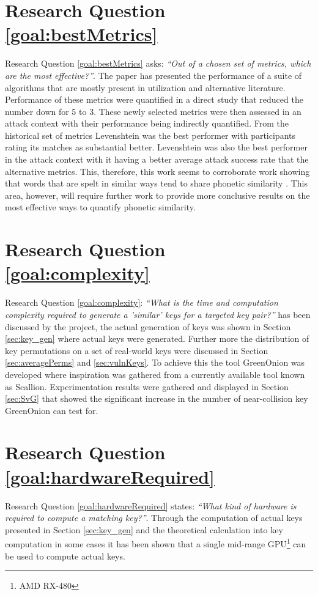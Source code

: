 \section{Research Question \ref{goal:bestMetrics}}
Research Question \ref{goal:bestMetrics} asks: \textit{``Out of a chosen set of metrics, which are the most effective?''}. 
The paper has presented the performance of a suite of algorithms that are mostly present in utilization and alternative literature. Performance of these metrics were quantified in a direct study that reduced the number down for 5 to 3. These newly selected metrics were then assessed in an attack context with their performance being indirectly quantified. From the historical set of metrics Levenshtein was the best performer with participants rating its matches as substantial better. Levenshtein was also the best performer in the attack context with it having a better average attack success rate that the alternative metrics. This, therefore, this work seems to corroborate work showing that words that are spelt in similar ways tend to share phonetic similarity \cite{hettiarachchi2012sparcl}. This area, however, will require further work to provide more conclusive results on the most effective ways to quantify phonetic similarity.

\section{Research Question \ref{goal:complexity}}
Research Question \ref{goal:complexity}: \textit{``What is the time and computation complexity required to generate a ’similar’ keys for a targeted key pair?''} has been discussed by the project, the actual generation of keys was shown in Section \ref{sec:key_gen} where actual keys were generated. Further more the distribution of key permutations on a set of real-world keys were discussed in Section \ref{sec:averagePerms} and \ref{sec:vulnKeys}. To achieve this the tool GreenOnion was developed where inspiration was gathered from a currently available tool known as Scallion. Experimentation results were gathered and displayed in Section \ref{sec:SvG} that showed the significant increase in the number of near-collision key GreenOnion can test for.

\section{Research Question \ref{goal:hardwareRequired}}
Research Question \ref{goal:hardwareRequired} states: \textit{``What kind of hardware is required to compute a matching key?''}. Through the computation of actual keys presented in Section \ref{sec:key_gen} and the theoretical calculation into key computation in some cases it has been shown that a single mid-range GPU\footnote{AMD RX-480} can be used to compute actual keys.

